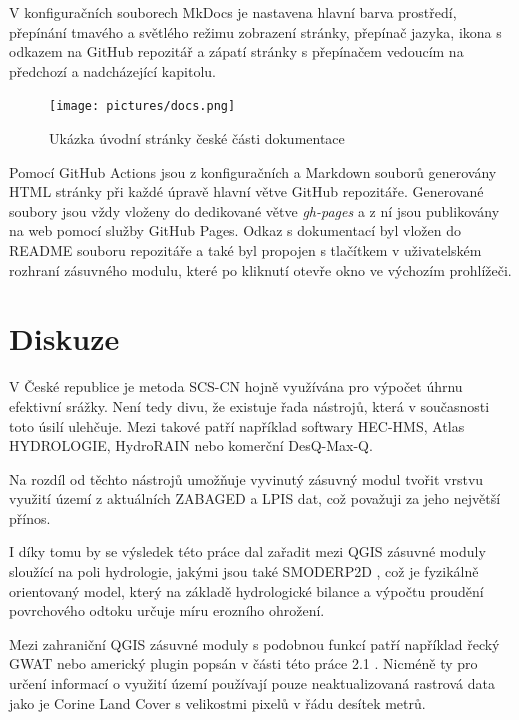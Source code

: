 \documentclass[a4paper,oneside,12pt]{book}
\begin{document}
\hspace{10mm} V konfiguračních souborech MkDocs je nastavena hlavní barva prostředí, přepínání tmavého a světlého režimu zobrazení stránky, přepínač jazyka, ikona s odkazem na GitHub repozitář a zápatí stránky s přepínačem vedoucím na předchozí a nadcházející kapitolu.

\begin{figure}[H] \label{obr23}
\centering
\texttt{[image: pictures/docs.png]}
\caption{Ukázka úvodní stránky české části dokumentace}
\label{fig:docs}
\end{figure}

\hspace{10mm} Pomocí GitHub Actions jsou z konfiguračních a Markdown souborů generovány HTML stránky při každé úpravě hlavní větve GitHub repozitáře. Generované soubory jsou vždy vloženy do dedikované větve \textit{gh-pages} a z ní jsou publikovány na web pomocí služby GitHub Pages. Odkaz s dokumentací byl vložen do README souboru repozitáře a také byl propojen s tlačítkem v uživatelském rozhraní zásuvného modulu, které po kliknutí otevře okno ve výchozím prohlížeči.

\chapter*{Diskuze} \label{discusion}
\hspace{10mm} V České republice je metoda SCS-CN hojně využívána pro výpočet úhrnu efektivní srážky. Není tedy divu, že existuje řada nástrojů, která v současnosti toto úsilí ulehčuje. Mezi takové patří například softwary HEC-HMS, Atlas HYDROLOGIE, HydroRAIN nebo komerční DesQ-Max-Q. \cite{MNYDGwleJOjKLRU2}

\hspace{10mm} Na rozdíl od těchto nástrojů umožňuje vyvinutý zásuvný modul tvořit vrstvu využití území z aktuálních ZABAGED a LPIS dat, což považuji za jeho největší přínos. 

\hspace{10mm} I díky tomu by se výsledek této práce dal zařadit mezi QGIS zásuvné moduly sloužící na poli hydrologie, jakými jsou také SMODERP2D \cite{Kavka2024}, což je fyzikálně orientovaný model, který na základě hydrologické bilance a výpočtu proudění povrchového odtoku určuje míru erozního ohrožení.

\hspace{10mm} Mezi zahraniční QGIS zásuvné moduly s podobnou funkcí patří například řecký GWAT \cite{lymperis2024} nebo americký plugin \cite{siddiqui2020} popsán v části této práce 2.1 . Nicméně ty pro určení informací o využití území používají pouze neaktualizovaná rastrová data jako je Corine Land Cover s velikostmi pixelů v řádu desítek metrů.
\end{document}
